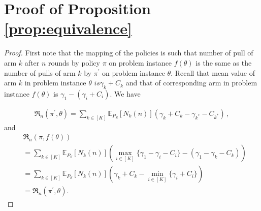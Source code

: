 \documentclass[11pt]{article} %
\newcommand{\EEi}[2]{\mathbb{E}_{#1}\left[#2\right]}
\newcommand{\Regret}{\mathfrak{R}}
\begin{document}
\section*{Proof of Proposition \ref{prop:equivalence}}
\begin{proof}First note that the mapping of the policies is such that number of pull of arm $k$ after $n$ rounds by policy $\pi$ on problem instance $f(\theta)$ is the same as the number of pulls of arm $k$ by $\pi^\prime$ on problem instance $\theta$. Recall that mean value of arm $k$ in problem instance $\theta$ $ is \gamma_k +C_k$ and that of corresponding arm in problem instance $f(\theta)$ is $\gamma_1-(\gamma_i+C_i)$. We have
	
	\begin{align*}
	\Regret_n(\pi^\prime,\theta) = \sum_{k\in [K]} \EEi{P_S}{N_k(n)}(\gamma_k+C_k-\gamma_{k^*}-C_{k^*}) \,,
	\end{align*}
	and
	\begin{align*}
	&\Regret_n(\pi,f(\theta))\\
	&= \sum_{k\in [K]} \EEi{P_S}{N_k(n)}\left (\max_{i \in [K]}\{\gamma_1-\gamma_i- C_i\}-(\gamma_1-\gamma_k- C_k)\right) \\
	&= \sum_{k\in [K]} \EEi{P_S}{N_k(n)}\left (\gamma_k+ C_k - \min_{i \in [K]}\{\gamma_i+ C_i\}\right) \\
	&=\Regret_n(\pi^\prime,\theta).
	\end{align*}
	\end{proof}
\end{document}
